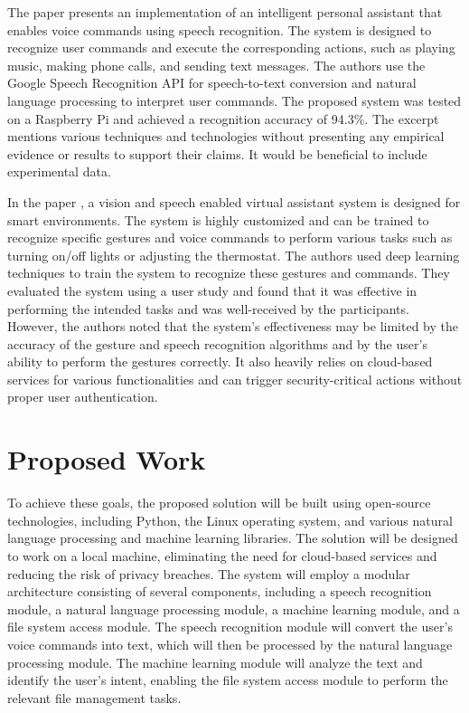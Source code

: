 \documentclass[conference]{IEEEtran}
\begin{document}
\par The paper \cite{kumaran2020intelligent} presents an implementation of an intelligent personal assistant that enables voice commands using speech recognition. The system is designed to recognize user commands and execute the corresponding actions, such as playing music, making phone calls, and sending text messages. The authors use the Google Speech Recognition API for speech-to-text conversion and natural language processing to interpret user commands. The proposed system was tested on a Raspberry Pi and achieved a recognition accuracy of 94.3\%. The excerpt mentions various techniques and technologies without presenting any empirical evidence or results to support their claims. It would be beneficial to include experimental data.

\par In the paper \cite{iannizzotto2018vision}, a vision and speech enabled virtual assistant system is designed for smart environments. The system is highly customized and can be trained to recognize specific gestures and voice commands to perform various tasks such as turning on/off lights or adjusting the thermostat. The authors used deep learning techniques to train the system to recognize these gestures and commands. They evaluated the system using a user study and found that it was effective in performing the intended tasks and was well-received by the participants. However, the authors noted that the system's effectiveness may be limited by the accuracy of the gesture and speech recognition algorithms and by the user's ability to perform the gestures correctly. It also heavily relies on cloud-based services for various functionalities and can trigger security-critical actions without proper user authentication.

\section{Proposed Work}
To achieve these goals, the proposed solution will be built using open-source technologies, including Python, the Linux operating system, and various natural language processing and machine learning libraries. The solution will be designed to work on a local machine, eliminating the need for cloud-based services and reducing the risk of privacy breaches. The system will employ a modular architecture consisting of several components, including a speech recognition module, a natural language processing module, a machine learning module, and a file system access module. The speech recognition module will convert the user's voice commands into text, which will then be processed by the natural language processing module. The machine learning module will analyze the text and identify the user's intent, enabling the file system access module to perform the relevant file management tasks.
\end{document}
